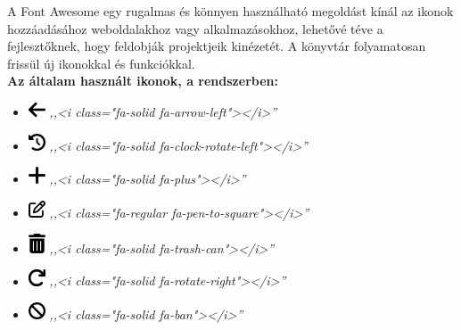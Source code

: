 \documentclass[
]{thesis-ekf}
\theoremstyle{definition}
\theoremstyle{remark}
\begin{document}
	A Font Awesome egy rugalmas és könnyen használható megoldást kínál az ikonok hozzáadásához weboldalakhoz vagy alkalmazásokhoz, lehetővé téve a fejlesztőknek, hogy feldobják projektjeik kinézetét. A könyvtár folyamatosan frissül új ikonokkal és funkciókkal.\cite{fontawesome}\\
	\textbf{Az általam használt ikonok, a rendszerben:}
	\begin{itemize}
		\item \includegraphics[width=0.5cm]{./img/arrow-left-solid}
		 	\emph{,,<i class="fa-solid fa-arrow-left"></i>''}
		
		\item \includegraphics[width=0.5cm]{./img/clock-rotate-left-solid} 
			\emph{,,<i class="fa-solid fa-clock-rotate-left"></i>''}
			
		\item \includegraphics[width=0.5cm]{./img/plus-solid} 
			\emph{,,<i class="fa-solid fa-plus"></i>''}
		
		\item \includegraphics[width=0.5cm]{./img/pen-to-square-regular}
			\emph{,,<i class="fa-regular fa-pen-to-square"></i>''}
			
		\item \includegraphics[width=0.5cm]{./img/trash-can-solid}
			\emph{,,<i class="fa-solid fa-trash-can"></i>''}
			
		\item \includegraphics[width=0.5cm]{./img/arrow-rotate-right-solid}
			\emph{,,<i class="fa-solid fa-rotate-right"></i>''}
		
		\item \includegraphics[width=0.5cm]{./img/ban-solid}
		 	\emph{,,<i class="fa-solid fa-ban"></i>''}
			

\end{itemize}
\end{document}
